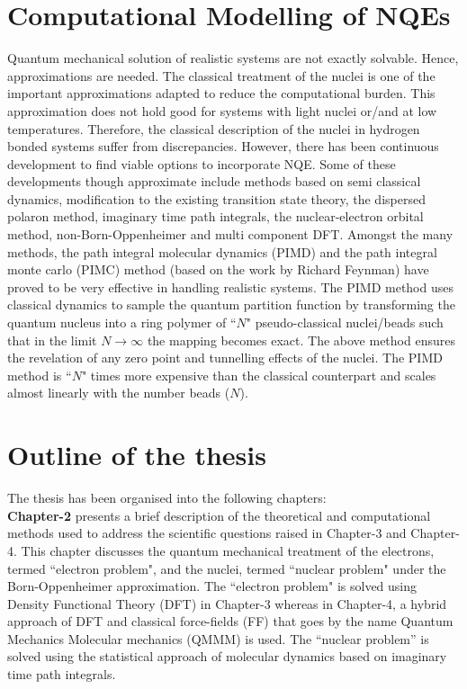 \section{Computational Modelling of NQEs}
Quantum mechanical solution of realistic systems are not exactly solvable. Hence, approximations are needed. The classical treatment of the nuclei is one of the important approximations adapted to reduce the computational burden. This approximation does not hold good for systems with light nuclei or/and at low temperatures. Therefore, the classical description of the nuclei in hydrogen bonded systems suffer from discrepancies. However, there has been continuous development to find viable options to incorporate NQE. Some of these developments though approximate include methods based on semi classical dynamics\cite{heller1975time,wang1998semiclassical}, modification to the existing transition state theory\cite{fernandez2007variational}, the dispersed polaron method\cite{warshel1986simulation}, imaginary time path integrals\cite{marx1994ab,feynman2010quantum}, the nuclear-electron orbital method\cite{multicomponentshs,webb2002multiconfigurational}, non-Born-Oppenheimer and multi component DFT\cite{capitani1982non,kreibich2001multicomponent}. Amongst the many methods,  the path integral molecular dynamics\cite{marx1994ab} (PIMD) and the path integral monte carlo\cite{herman1982path} (PIMC) method (based on the work by Richard Feynman\cite{feynman2010quantum}) have proved to be very effective in handling realistic systems. The PIMD method uses classical dynamics to sample the quantum partition function by transforming the quantum nucleus into a ring polymer of ``$N$" pseudo-classical nuclei/beads such that in the limit $N \rightarrow \infty$ the mapping becomes exact. The above method ensures the revelation of any zero point and tunnelling effects of the nuclei. The PIMD method is ``$N$" times more expensive than the classical counterpart and scales almost linearly with the number beads ($N$).

\section{Outline of the thesis}

The thesis has been organised into the following chapters:
\\

\noindent \textbf{Chapter-2} presents a brief description of the theoretical and computational methods used to address the scientific questions raised in Chapter-3 and Chapter-4. This chapter  discusses the quantum  mechanical treatment of the electrons, termed ``electron problem", and the nuclei, termed ``nuclear problem" under the Born-Oppenheimer approximation. The ``electron problem" is solved using Density Functional Theory (DFT) in Chapter-3 whereas in Chapter-4, a hybrid approach of DFT and classical force-fields (FF) that goes by the name Quantum Mechanics Molecular mechanics (QMMM) is used. The ``nuclear problem'' is solved using the statistical approach of molecular dynamics based on imaginary time path integrals. 

